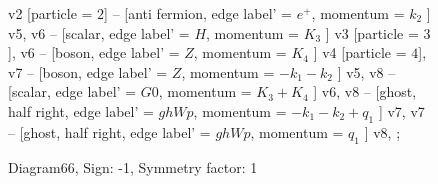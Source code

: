 \documentclass{revtex4}
\begin{document}
\begin{figure}[!htb]
\begin{center}
{v2 [particle = \(2\)] -- [anti fermion, edge label' = \(e^{+}\), momentum = \(k_{2}\) ] v5, 
v6 -- [scalar, edge label' = \(H\), momentum = \(K_{3}\) ] v3 [particle = \(3\)], 
v6 -- [boson, edge label' = \(Z\), momentum = \(K_{4}\) ] v4 [particle = \(4\)], 
v7 -- [boson, edge label' = \(Z\), momentum = \(-k_{1} - k_{2}\) ] v5, 
v8 -- [scalar, edge label' = \(G0\), momentum = \(K_{3} + K_{4}\) ] v6, 
v8 -- [ghost, half right, edge label' = \(ghWp\), momentum = \(-k_{1} - k_{2} + q_{1}\) ] v7, 
v7 -- [ghost, half right, edge label' = \(ghWp\), momentum = \(q_{1}\) ] v8, 
};
\end{center}
\caption{Diagram66, Sign: -1, Symmetry factor: 1}
\end{figure}
\newpage
\end{document}
